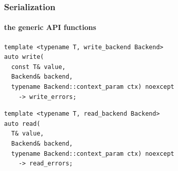 \documentclass[compress,table,xcolor=table]{beamer}
\begin{document}
\begin{frame}[fragile]
\begin{columns}
  \end{columns}
\end{frame}
\begin{frame}[fragile]
  \frametitle{Serialization}
  \framesubtitle{the generic API functions}
  \begin{lstlisting}[language=c++2x,basicstyle=\small\ttfamily]
template <typename T, write_backend Backend>
auto write(
  const T& value,
  Backend& backend,
  typename Backend::context_param ctx) noexcept
    -> write_errors;
  \end{lstlisting}
  \vfill
  \begin{lstlisting}[language=c++2x,basicstyle=\small\ttfamily]
template <typename T, read_backend Backend>
auto read(
  T& value,
  Backend& backend,
  typename Backend::context_param ctx) noexcept
    -> read_errors;
  \end{lstlisting}
\end{frame}
\end{document}
